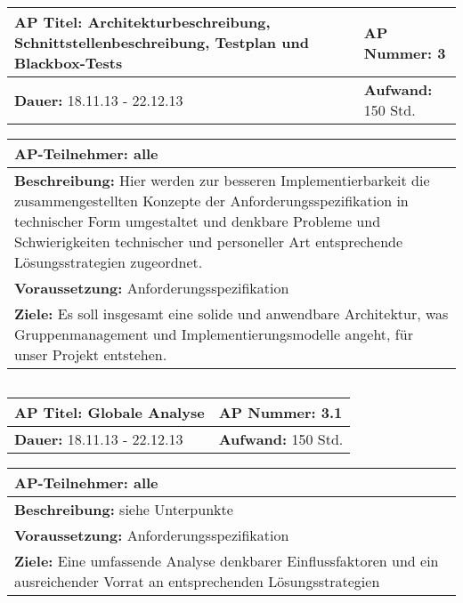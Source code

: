 \begin{tabular}{|p{7.43cm}|p{7.43cm}|}
\hline
\textbf{AP Titel: }Architekturbeschreibung, Schnittstellenbeschreibung, Testplan und Blackbox-Tests & \textbf{AP Nummer: }3\\ 
\hline
\textbf{Dauer: }18.11.13 - 22.12.13& \textbf{Aufwand: }150 Std.\\
\hline
\end{tabular}
\begin{tabular}{|p{15.3cm}|}
\hline
\textbf{AP-Teilnehmer: }alle\\
\hline
\textbf{Beschreibung: }Hier werden zur besseren Implementierbarkeit die zusammengestellten Konzepte der Anforderungsspezifikation in technischer Form umgestaltet und denkbare Probleme und Schwierigkeiten technischer und personeller Art entsprechende Lösungsstrategien zugeordnet.  \\
\hline
\textbf{Voraussetzung: }Anforderungsspezifikation\\
\hline 
\textbf{Ziele: }Es soll insgesamt eine solide und anwendbare Architektur, was Gruppenmanagement und Implementierungsmodelle angeht,  für unser Projekt entstehen.\\
\hline 
\end{tabular}
\begin{verbatim}

\end{verbatim}

\begin{tabular}{|p{7.43cm}|p{7.43cm}|}
\hline
\textbf{AP Titel: }Globale Analyse & \textbf{AP Nummer: }3.1\\ 
\hline
\textbf{Dauer: }18.11.13 - 22.12.13& \textbf{Aufwand: }150 Std.\\
\hline
\end{tabular}
\begin{tabular}{|p{15.3cm}|}
\hline
\textbf{AP-Teilnehmer: }alle\\
\hline
\textbf{Beschreibung: }siehe Unterpunkte\\
\hline
\textbf{Voraussetzung: }Anforderungsspezifikation\\
\hline 
\textbf{Ziele: }Eine umfassende Analyse denkbarer Einflussfaktoren und ein ausreichender Vorrat an entsprechenden Lösungsstrategien\\
\hline 
\end{tabular}
\begin{verbatim}

\end{verbatim}

